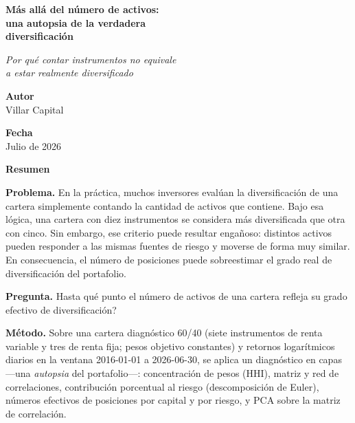 \documentclass[12pt,letterpaper]{article}
\begin{document}
\begin{titlepage}
\centering
\vspace*{3.2cm}

{\LARGE\bfseries Más allá del número de activos:\\[0.35em]
una autopsia de la verdadera\\[0.15em]
diversificación\par}

\vspace{1.1em}

{\Large\itshape Por qué contar instrumentos no equivale\\
a estar realmente diversificado\par}

\vspace{2.6em}

{\bfseries Autor}\\[0.35em]
Villar Capital

\vspace{1.6em}

{\bfseries Fecha}\\[0.35em]
Julio de 2026

\vfill
\end{titlepage}

\begin{center}
{\LARGE\bfseries Resumen}
\end{center}
\vspace{0.8em}

\noindent\textbf{Problema.}
En la práctica, muchos inversores evalúan la diversificación de una cartera simplemente contando la cantidad de activos que contiene. Bajo esa lógica, una cartera con diez instrumentos se considera más diversificada que otra con cinco. Sin embargo, ese criterio puede resultar engañoso: distintos activos pueden responder a las mismas fuentes de riesgo y moverse de forma muy similar. En consecuencia, el número de posiciones puede sobreestimar el grado real de diversificación del portafolio.

\noindent\textbf{Pregunta.}
\textquestiondown{}Hasta qué punto el número de activos de una cartera refleja su grado efectivo de diversificación?

\noindent\textbf{Método.}
Sobre una cartera diagnóstico 60/40 (siete instrumentos de renta variable y tres de renta fija; pesos objetivo constantes) y retornos logarítmicos diarios en la ventana 2016-01-01 a 2026-06-30, se aplica un diagnóstico en capas ---una \emph{autopsia} del portafolio---: concentración de pesos (HHI), matriz y red de correlaciones, contribución porcentual al riesgo (descomposición de Euler), números efectivos de posiciones por capital y por riesgo, y PCA sobre la matriz de correlación.
\end{document}

